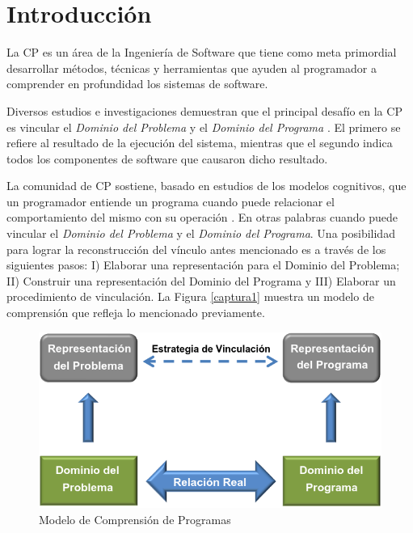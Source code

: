 
\section{Introducción}

La CP es un área de la Ingeniería de Software que tiene como meta primordial desarrollar métodos, técnicas y herramientas que ayuden al programador a comprender en profundidad los sistemas de software. 

Diversos estudios e investigaciones demuestran que el principal desafío en la CP es vincular el \textit{Dominio del Problema} y el \textit{Dominio del Programa} \cite{BRM10,MPMR07,MBPHRU10,DWE04}. El primero se refiere al resultado de la ejecución del sistema, mientras que el segundo indica todos los componentes de software que causaron dicho resultado. 

La comunidad de CP sostiene, basado en estudios de los modelos cognitivos, que un programador entiende un programa cuando puede relacionar el comportamiento del mismo con su operación \cite{VRNW02,BPVU06,MMDNP12}. En otras palabras cuando puede vincular el \textit{Dominio del Problema} y el \textit{Dominio del Programa}. Una posibilidad para lograr la reconstrucción del vínculo antes mencionado es a través de los siguientes pasos: I) Elaborar una representación para el Dominio del Problema; II) Construir una representación del Dominio del Programa y III) Elaborar un procedimiento de vinculación. La Figura \ref{captura1} muestra un modelo de comprensión que refleja lo mencionado previamente.

\begin{figure}[t] %
\centerline{%
\includegraphics[scale= 0.7]{./cap2/dom.png}
}
\caption{Modelo de Comprensión de Programas}
\end{figure} \label{captura1}
 
